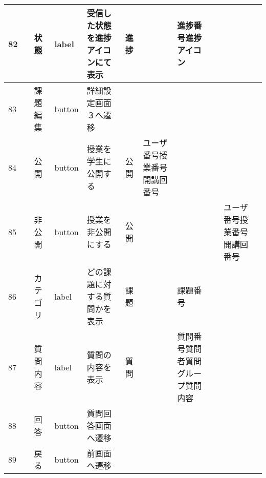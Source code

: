 \begin{landscape}
\begin{table}[]
\begin{tabular}{|l|l|l|l|l|l|l|l|l|l|l|}
82  &               & 状態               & label    & 受信した状態を進捗アイコンにて表示                                                 & 進捗      &                       & 進捗番号進捗アイコン         &                 &                               &                                                                \\ \hline
83  &               & 課題編集             & button   & 詳細設定画面３へ遷移                                                        &         &                       &                    &                 &                               &                                                                \\ \hline
84  &               & 公開               & button   & 授業を学生に公開する                                                        & 公開      & ユーザ番号授業番号開講回番号        &                    &                 &                               &                                                                \\ \hline
85  &               & 非公開              & button   & 授業を非公開にする                                                         & 公開      &                       &                    &                 & ユーザ番号授業番号開講回番号                &                                                                \\ \hline
86  &               & カテゴリ             & label    & どの課題に対する質問かを表示                                                    & 課題      &                       & 課題番号               &                 &                               &                                                                \\ \hline
87  &               & 質問内容             & label    & 質問の内容を表示                                                          & 質問      &                       & 質問番号質問者質問グループ質問内容  &                 &                               &                                                                \\ \hline
88  &               & 回答               & button   & 質問回答画面へ遷移                                                         &         &                       &                    &                 &                               &                                                                \\ \hline
89  &               & 戻る               & button   & 前画面へ遷移                                                            &         &                       &                    &                 &                               &                                                                \\ \hline
\end{tabular}
\end{table}


\end{landscape}

